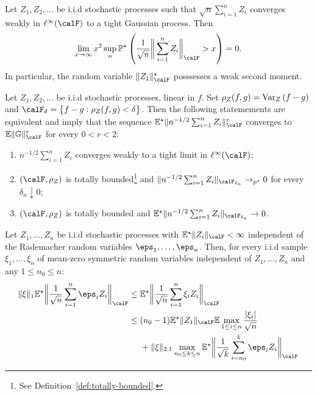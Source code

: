 \begin{lemma}
	\label{lemma:donsker-implication}
	Let \(Z_1,Z_2,\dots\) be i.i.d stochastic processes such that \(\sqrt{n}\sum_{i=1}^n Z_i\) converges weakly in \(\ell^\infty(\calF)\) to a tight Gaussian process. Then
	\[
		\lim_{x\to\infty}x^2\sup_n \P^\star\left(\frac{1}{\sqrt{n}}\bigg\|\sum_{i=1}^n Z_i\bigg\|_\calF > x\right) = 0
	.\] 
	In particular, the random variable \(\|Z_1\|^\star_\calF\) posssesses a weak second moment.
\end{lemma}
\begin{lemma}
	\label{lemma:convergence-characterizations}
	Let \(Z_1,Z_2,\dots\) be i.i.d stochastic processes, linear in \(f\). Set \(\rho_Z(f,g) = \operatorname{Var}_Z\left(f-g\right)\) and \(\calF_\delta = \left\{f-g:\rho_Z(f,g)<\delta\right\}\). Then the following statemements are equivalent and imply that the sequence \(\E^\star\|n^{-1/2}\sum_{i=1}^n Z_i\|_\calF^r\) converges to \(\E\|\mathbb{G}\|_\calF^r\) for every \(0<r<2\):
	\begin{enumerate}
		\item \(n^{-1/2}\sum_{i=1}^n Z_i\) converges weakly to a tight limit in \(\ell^\infty(\calF)\);
		\item \((\calF,\rho_Z)\) is totally bounded\footnote{See Definition~\ref{def:totally-bounded}.} and \(\|n^{-1/2}\sum_{i=1}^n Z_i\|_{\calF_{\delta_n}}\to_{p^\star}0\) for every \(\delta_n\downarrow 0\);
		\item \((\calF,\rho_Z)\) is totally bounded and \(\E^\star\|n^{-1/2}\sum_{i=1}^n Z_i\|_{\calF_{\delta_n}}\to0\).
	\end{enumerate}
\end{lemma}
\begin{lemma}
	\label{lemma:vdv2.9.1}
	Let \(Z_1,\dots,Z_n\) be i.i.d stochastic processes with \(\E^\star\|Z_i\|_\calF<\infty\) independent of the Rademacher random variables \(\eps_1,\dots,\eps_n\). Then, for every i.i.d sample \(\xi_1,\dots,\xi_n\) of mean-zero symmetric random variables independent of \(Z_1,\dots,Z_n\) and any \(1\leq n_0\leq n\):
	\begin{align*}
		\|\xi\|_1\E^\star\bigg\|\frac{1}{\sqrt{n}}\sum_{i=1}^n \eps_iZ_i\bigg\|_\calF 
		&\leq \E^\star\bigg\|\frac{1}{\sqrt{n}}\sum_{i=1}^n \xi_iZ_i\bigg\|_\calF \\
		&\leq (n_0-1)\E^\star\|Z_1\|_\calF\E\max_{1\leq i\leq n}\frac{|\xi_i|}{\sqrt{n}} \\ 
		&\;\;\;\;\;+ \|\xi\|_{2,1}\max_{n_0\leq k\leq n}\E^\star\bigg\|\frac{1}{\sqrt{k}}\sum_{i=n_0}^k\eps_iZ_i \bigg\|_\calF 
	\end{align*}
\end{lemma}

